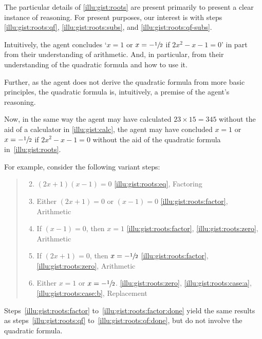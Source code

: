 \begin{note}
  The particular details of \autoref{illu:gist:roots} are present primarily to present a clear instance of reasoning.
  For present purposes, our interest is with steps \ref{illu:gist:roots:qf}, \ref{illu:gist:roots:subs}, and \ref{illu:gist:roots:qf-subs}.

  Intuitively, the agent concludes `\(x = 1\) or \(x = -\sfrac{1}{2}\) if \(2x^{2} - x - 1 = 0\)' in part from their understanding of arithmetic.
  And, in particular, from their understanding of the quadratic formula and how to use it.

  Further, as the agent does not derive the quadratic formula from more basic principles, the quadratic formula is, intuitively, a premise of the agent's reasoning.
\end{note}

\begin{note}
  Now, in the same way the agent may have calculated \(23 \times 15 = 345\) without the aid of a calculator in \autoref{illu:gist:calc}, the agent may have concluded \(x = 1\) or \(x = -\sfrac{1}{2}\) if \(2x^{2} - x - 1 = 0\) without the aid of the quadratic formula in~\autoref{illu:gist:roots}.

  For example, consider the following variant steps:
  \begin{quote}
    \begin{enumerate}[label=\arabic*\('\)., ref=(\arabic*\('\)), itemsep=.125em]
      \setcounter{enumi}{1}
    \item
      \label{illu:gist:roots:factor}
      \((2x + 1)(x - 1) = 0\) \hfill \ref{illu:gist:roots:eq}, Factoring
    \item
      \label{illu:gist:roots:zero}
      Either \((2x + 1) = 0\) or \((x - 1) = 0\) \hfill \ref{illu:gist:roots:factor}, Arithmetic
    \item
      \label{illu:gist:roots:case:a}
      If \((x - 1) = 0\), then \(x = 1\) \hfill \ref{illu:gist:roots:factor}, \ref{illu:gist:roots:zero}, Arithmetic
    \item
      \label{illu:gist:roots:case:b}
      If \((2x + 1) = 0\), then \(x = -\sfrac{1}{2}\) \hfill \ref{illu:gist:roots:factor}, \ref{illu:gist:roots:zero}, Arithmetic
    \item
      \label{illu:gist:roots:factor:done}
      Either \(x = 1\) or \(x = -\sfrac{1}{2}\). \hfill \ref{illu:gist:roots:zero}, \ref{illu:gist:roots:case:a}, \ref{illu:gist:roots:case:b}, Replacement
    \end{enumerate}
  \end{quote}

  Steps~\ref{illu:gist:roots:factor} to~\ref{illu:gist:roots:factor:done} yield the same results as steps~\ref{illu:gist:roots:qf} to~\ref{illu:gist:roots:qf:done}, but do not involve the quadratic formula.
\end{note}

